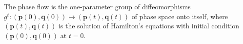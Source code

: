 The phase flow is the one-parameter group of diffeomorphisms $g^t: (\mathbf{p}(0), \mathbf{q}(0)) \mapsto (\mathbf{p}(t), \mathbf{q}(t))$ of phase space onto itself, where $(\mathbf{p}(t), \mathbf{q}(t))$ is the solution of Hamilton's equations with initial condition $(\mathbf{p}(0), \mathbf{q}(0))$ at $t = 0$.